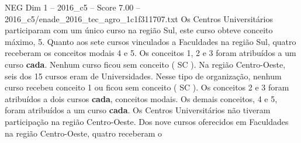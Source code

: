 \begin{textsample}{NEG Dim 1 – 2016\_c5 – Score 7.00 – 2016\_c5/enade\_2016\_tec\_agro\_1c1f311707.txt}
Os Centros Universitários participaram com um único curso na região Sul, este curso obteve conceito máximo, 5.
Quanto aos sete cursos vinculados a Faculdades na região Sul, quatro receberam os conceitos modais 4 e 5.
Os conceitos 1, 2 e 3 foram atribuídos a um curso \textbf{cada}.
Nenhum curso ficou sem conceito ( SC ).
Na região Centro-Oeste, seis dos 15 cursos eram de Universidades.
Nesse tipo de organização, nenhum curso recebeu conceito 1 ou ficou sem conceito ( SC ).
Os conceitos 2 e 3 foram atribuídos a dois cursos \textbf{cada}, conceitos modais.
Os demais conceitos, 4 e 5, foram atribuídos a um curso \textbf{cada}.
Os Centros Universitários não tiveram participação na região Centro-Oeste.
Dos nove cursos oferecidos em Faculdades na região Centro-Oeste, quatro receberam o

\end{textsample}
